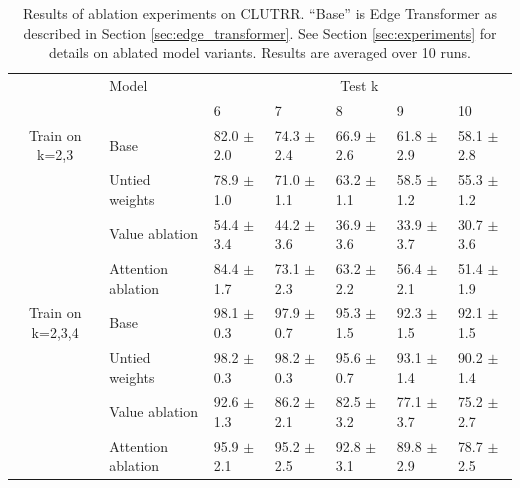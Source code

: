 \documentclass{article}
\begin{document}
\begin{table}
\small
\caption{
  Results of ablation experiments on CLUTRR. ``Base'' is
  Edge Transformer as described in Section \ref{sec:edge_transformer}.
  See Section \ref{sec:experiments} for details on ablated model
  variants. Results are averaged over 10 runs. }
    \label{tbl:lesion_clutrr}
    \centering
    \begin{tabular}{cllllll}
    \toprule
    \multicolumn{1}{l}{}                                                       & Model                    & \multicolumn{5}{c}{Test k} \\ 
    
    \multicolumn{1}{l}{}                                                       &                          & 6       & 7      & 8      & 9      & 10     \\ 
    \midrule
    Train on k=2,3%
    & Base   & 82.0 $\pm$ 2.0    & 74.3 $\pm$ 2.4   & 66.9 $\pm$ 2.6 & 61.8 $\pm$ 2.9   & 58.1 $\pm$ 2.8  \\
 & Untied weights        & 78.9 $\pm$ 1.0    & 71.0 $\pm$ 1.1   & 63.2 $\pm$ 1.1   & 58.5 $\pm$ 1.2   & 55.3 $\pm$ 1.2   \\
  & Value ablation & 54.4 $\pm$ 3.4    & 44.2 $\pm$ 3.6   & 36.9 $\pm$ 3.6   & 33.9 $\pm$ 3.7   & 30.7 $\pm$ 3.6   \\ 
  & Attention ablation & 84.4 $\pm$ 1.7   & 73.1 $\pm$ 2.3   & 63.2 $\pm$ 2.2   & 56.4 $\pm$ 2.1  & 51.4 $\pm$ 1.9  \\
                                                                                \hline
    Train on k=2,3,4 %
    & Base         & 98.1 $\pm$ 0.3   & 97.9 $\pm$ 0.7  & 95.3  $\pm$ 1.5   & 92.3 $\pm$ 1.5   & 92.1 $\pm$ 1.5   \\
    & Untied weights    & 98.2 $\pm$ 0.3   & 98.2 $\pm$ 0.3   & 95.6 $\pm$ 0.7   & 93.1 $\pm$ 1.4  & 90.2 $\pm$ 1.4  \\
    & Value ablation & 92.6 $\pm$ 1.3    & 86.2 $\pm$ 2.1   & 82.5 $\pm$ 3.2  & 77.1 $\pm$ 3.7  & 75.2 $\pm$ 2.7  \\
     & Attention ablation & 95.9 $\pm$ 2.1   & 95.2 $\pm$ 2.5  & 92.8 $\pm$ 3.1   & 89.8 $\pm$ 2.9  & 78.7 $\pm$ 2.5  \\
    \bottomrule
    \end{tabular}
\end{table}
\end{document}
